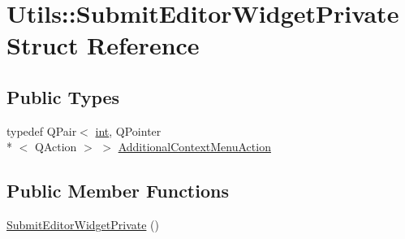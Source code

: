\hypertarget{struct_utils_1_1_submit_editor_widget_private}{\section{Utils\-:\-:Submit\-Editor\-Widget\-Private Struct Reference}
\label{struct_utils_1_1_submit_editor_widget_private}
}
\subsection*{Public Types}
\begin{DoxyCompactItemize}
\item 
typedef Q\-Pair$<$ \hyperlink{ioapi_8h_a787fa3cf048117ba7123753c1e74fcd6}{int}, Q\-Pointer\\*
$<$ Q\-Action $>$ $>$ \hyperlink{struct_utils_1_1_submit_editor_widget_private_adb3c92b95990f75654e9c25101be736d}{Additional\-Context\-Menu\-Action}
\end{DoxyCompactItemize}
\subsection*{Public Member Functions}
\begin{DoxyCompactItemize}
\item 
\hyperlink{struct_utils_1_1_submit_editor_widget_private_a4b87ebfe03cbd5619cf5ba30997c12da}{Submit\-Editor\-Widget\-Private} ()
\end{DoxyCompactItemize}
